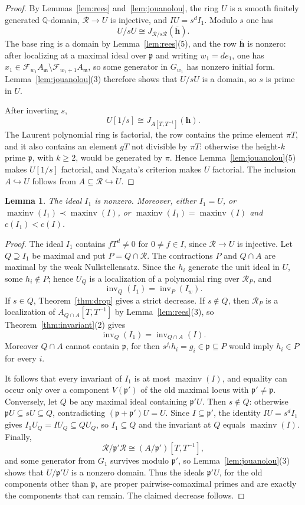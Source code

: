 \documentclass[11pt]{amsart}
\numberwithin{equation}{section}
\newtheorem{lemma}[theorem]{Lemma}
\theoremstyle{definition}
\newcommand{\Q}{\mathbb{Q}}
\newcommand{\fm}{\mathfrak{m}}
\newcommand{\fp}{\mathfrak{p}}
\newcommand{\cF}{\mathcal{F}}
\newcommand{\cR}{\mathcal{R}}
\DeclareMathOperator{\inv}{inv}
\DeclareMathOperator{\maxinv}{maxinv}
\begin{document}
\begin{proof}
By Lemmas~\ref{lem:rees} and~\ref{lem:jouanolou}, the ring $U$ is a smooth finitely generated $\Q$-domain, $\cR\to U$ is injective, and $IU=s^dI_1$. Modulo $s$ one has
\[
  U/sU\cong J_{\cR/s\cR}(\overline{\mathbf h}).
\]
The base ring is a domain by Lemma~\ref{lem:rees}(5), and the row $\overline{\mathbf h}$ is nonzero: after localizing at a maximal ideal over $\fp$ and writing $w_1=de_1$, one has $x_1\in\cF_{w_1}A_\fm\setminus\cF_{w_1+1}A_\fm$, so some generator in $G_{w_1}$ has nonzero initial form. Lemma~\ref{lem:jouanolou}(3) therefore shows that $U/sU$ is a domain, so $s$ is prime in $U$.

After inverting $s$,
\[
  U[1/s]\cong J_{A[T,T^{-1}]}(\mathbf h).
\]
The Laurent polynomial ring is factorial, the row contains the prime element $\pi T$, and it also contains an element $gT$ not divisible by $\pi T$: otherwise the height-$k$ prime $\fp$, with $k\ge2$, would be generated by $\pi$. Hence Lemma~\ref{lem:jouanolou}(5) makes $U[1/s]$ factorial, and Nagata's criterion makes $U$ factorial. The inclusion $A\hookrightarrow U$ follows from $A\subseteq\cR\hookrightarrow U$.
\end{proof}

\begin{lemma}\label{lem:torsor-invariant}
The ideal $I_1$ is nonzero. Moreover, either $I_1=U$, or $\maxinv(I_1)\prec\maxinv(I)$, or $\maxinv(I_1)=\maxinv(I)$ and $c(I_1)<c(I)$.
\end{lemma}

\begin{proof}
The ideal $I_1$ contains $fT^d\ne0$ for $0\ne f\in I$, since $\cR\to U$ is injective. Let $Q\supseteq I_1$ be maximal and put $P=Q\cap\cR$. The contractions $P$ and $Q\cap A$ are maximal by the weak Nullstellensatz. Since the $h_i$ generate the unit ideal in $U$, some $h_i\notin P$; hence $U_Q$ is a localization of a polynomial ring over $\cR_P$, and
\[
  \inv_Q(I_1)=\inv_P(I_w).
\]
If $s\in Q$, Theorem~\ref{thm:drop} gives a strict decrease. If $s\notin Q$, then $\cR_P$ is a localization of $A_{Q\cap A}[T,T^{-1}]$ by Lemma~\ref{lem:rees}(3), so Theorem~\ref{thm:invariant}(2) gives
\[
  \inv_Q(I_1)=\inv_{Q\cap A}(I).
\]
Moreover $Q\cap A$ cannot contain $\fp$, for then $s^{j_i}h_i=g_i\in\fp\subseteq P$ would imply $h_i\in P$ for every $i$.

It follows that every invariant of $I_1$ is at most $\maxinv(I)$, and equality can occur only over a component $V(\fp')$ of the old maximal locus with $\fp'\ne\fp$. Conversely, let $Q$ be any maximal ideal containing $\fp'U$. Then $s\notin Q$: otherwise $\fp U\subseteq sU\subseteq Q$, contradicting $(\fp+\fp')U=U$. Since $I\subseteq\fp'$, the identity $IU=s^dI_1$ gives $I_1U_Q=IU_Q\subseteq QU_Q$, so $I_1\subseteq Q$ and the invariant at $Q$ equals $\maxinv(I)$. Finally,
\[
  \cR/\fp'\cR\cong(A/\fp')[T,T^{-1}],
\]
and some generator from $G_1$ survives modulo $\fp'$, so Lemma~\ref{lem:jouanolou}(3) shows that $U/\fp'U$ is a nonzero domain. Thus the ideals $\fp'U$, for the old components other than $\fp$, are proper pairwise-comaximal primes and are exactly the components that can remain. The claimed decrease follows.
\end{proof}
\end{document}

